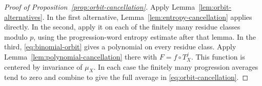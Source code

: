 \begin{proof}[Proof of Proposition~\ref{prop:orbit-cancellation}]
Apply Lemma~\ref{lem:orbit-alternatives}. In the first alternative,
Lemma~\ref{lem:entropy-cancellation} applies directly. In the second,
apply it on each of the finitely many residue classes modulo $p$, using
the progression-word entropy estimate after that lemma. In the third,
\eqref{eq:binomial-orbit} gives a polynomial on every residue class.
Apply Lemma~\ref{lem:polynomial-cancellation} there with
$F=f\circ T_X^j$. This function is centered by invariance of $\mu_X$.
In each case the finitely many progression averages tend to zero and
combine to give the full average in \eqref{eq:orbit-cancellation}.
\end{proof}
